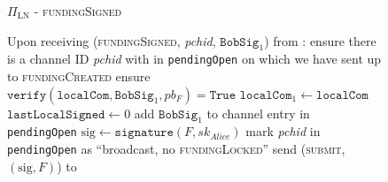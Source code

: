   \begin{figure}[H]
    \begin{protocolbox}{$\Pi_{\mathrm{LN}}$ - \textsc{fundingSigned}}
      \begin{algorithmic}[1]
        \State Upon receiving (\textsc{fundingSigned}, \textit{pchid},
        $\mathtt{BobSig}_1$) from \bob:
        \Indent
          \State ensure there is a channel ID \textit{pchid} with \bob{} in
          \texttt{pendingOpen} on which we have sent up to
          \textsc{fundingCreated}
          \State ensure $\mathtt{verify}\left(\mathtt{localCom},
          \mathtt{BobSig}_1, pb_F\right) = \mathtt{True}$
          \State $\mathtt{localCom}_1 \gets \mathtt{localCom}$
          \State $\mathtt{lastLocalSigned} \gets 0$
          \State add $\mathtt{BobSig}_1$ to channel entry in
          \texttt{pendingOpen}
          \State $\mathrm{sig} \gets \mathtt{signature}\left(F,
          sk_{\mathit{Alice}}\right)$
          \State mark \textit{pchid} in \texttt{pendingOpen} as ``broadcast, no
          \textsc{fundingLocked}''
          \State send (\textsc{submit}, $\left(\mathrm{sig}, F\right)$) to
          \ledger
        \EndIndent
      \end{algorithmic}
    \end{protocolbox}
    \caption{}
    \label{alg:protocol:open:fundingSigned}
  \end{figure}

